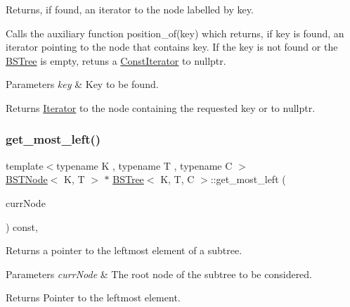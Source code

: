 Returns, if found, an iterator to the node labelled by key. 

Calls the auxiliary function position\+\_\+of(key) which returns, if key is found, an iterator pointing to the node that contains key. If the key is not found or the \hyperlink{class_b_s_tree}{B\+S\+Tree} is empty, retuns a \hyperlink{class_b_s_tree_1_1_const_iterator}{Const\+Iterator} to nullptr.


\begin{DoxyParams}{Parameters}
{\em key} & Key to be found. \\
\hline
\end{DoxyParams}
\begin{DoxyReturn}{Returns}
\hyperlink{class_b_s_tree_1_1_iterator}{Iterator} to the node containing the requested key or to nullptr. 
\end{DoxyReturn}
\mbox{\label{class_b_s_tree_ab77c72f33d88ca3311286744370138bb}} 
\subsubsection{\texorpdfstring{get\+\_\+most\+\_\+left()}{get\_most\_left()}}
{\footnotesize\ttfamily template$<$typename K , typename T , typename C $>$ \\
\hyperlink{class_node_namespace_1_1_b_s_t_node}{B\+S\+T\+Node}$<$ K, T $>$ $\ast$ \hyperlink{class_b_s_tree}{B\+S\+Tree}$<$ K, T, C $>$\+::get\+\_\+most\+\_\+left (\begin{DoxyParamCaption}\item[{\hyperlink{class_node_namespace_1_1_b_s_t_node}{B\+S\+T\+Node}$<$ K, T $>$ $\ast$}]{curr\+Node }\end{DoxyParamCaption}) const\hspace{0.3cm}{\ttfamily [private]}, {\ttfamily [noexcept]}}



Returns a pointer to the leftmost element of a subtree. 


\begin{DoxyParams}{Parameters}
{\em curr\+Node} & The root node of the subtree to be considered. \\
\hline
\end{DoxyParams}
\begin{DoxyReturn}{Returns}
Pointer to the leftmost element. 
\end{DoxyReturn}
\mbox{\label{class_b_s_tree_add1b6b6c2b9b5a871d6ae06ba2ab174f}} 
